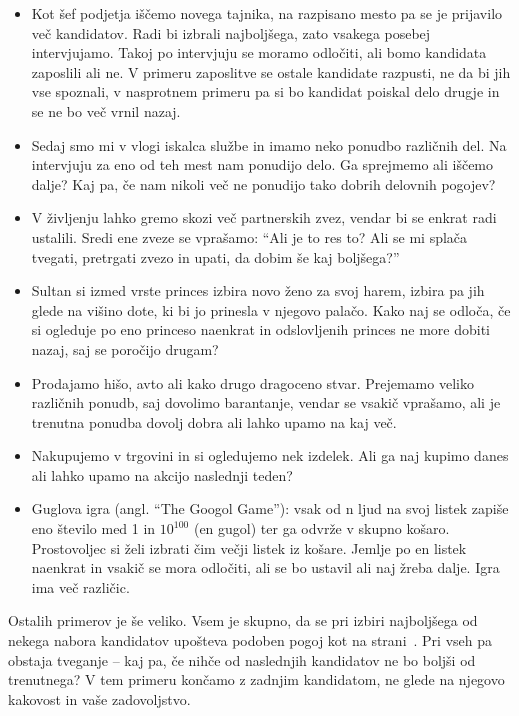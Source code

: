 \documentclass[a4paper, 12pt, titlepage]{article}
\begin{document}
\begin{itemize}
    \item Kot šef podjetja iščemo novega tajnika, na razpisano mesto pa se je prijavilo več kandidatov. Radi bi izbrali najboljšega, zato vsakega posebej intervjujamo. Takoj po intervjuju se moramo odločiti, ali bomo kandidata zaposlili ali ne. V primeru zaposlitve se ostale kandidate razpusti, ne da bi jih vse spoznali, v nasprotnem primeru pa si bo kandidat poiskal delo drugje in se ne bo več vrnil nazaj.
    \item Sedaj smo mi v vlogi iskalca službe in imamo neko ponudbo različnih del. Na intervjuju za eno od teh mest nam ponudijo delo. Ga sprejmemo ali iščemo dalje? Kaj pa, če nam nikoli več ne ponudijo tako dobrih delovnih pogojev?
    \item V življenju lahko gremo skozi več partnerskih zvez, vendar bi se enkrat radi ustalili. Sredi ene zveze se vprašamo: ``Ali je to res to? Ali se mi splača tvegati, pretrgati zvezo in upati, da dobim še kaj boljšega?''
    \item Sultan si izmed vrste princes izbira novo ženo za svoj harem, izbira pa jih glede na višino dote, ki bi jo prinesla v njegovo palačo. Kako naj se odloča, če si ogleduje po eno princeso naenkrat in odslovljenih princes ne more dobiti nazaj, saj se poročijo drugam?
    \item Prodajamo hišo, avto ali kako drugo dragoceno stvar. Prejemamo veliko različnih ponudb, saj dovolimo barantanje, vendar se vsakič vprašamo, ali je trenutna ponudba dovolj dobra ali lahko upamo na kaj več.
    \item Nakupujemo v trgovini in si ogledujemo nek izdelek. Ali ga naj kupimo danes ali lahko upamo na akcijo naslednji teden?
    \item Guglova igra (angl. ``The Googol Game''): vsak od n ljud na svoj listek zapiše eno število med 1 in $10^{100}$ (en gugol) ter ga odvrže v skupno košaro. Prostovoljec si želi izbrati čim večji listek iz košare. Jemlje po en listek naenkrat in vsakič se mora odločiti, ali se bo ustavil ali naj žreba dalje. Igra ima več različic.
\end{itemize}

Ostalih primerov je še veliko. Vsem je skupno, da se pri izbiri najboljšega od nekega nabora kandidatov upošteva podoben pogoj kot na strani~\pageref{pogoj_za_nakup}. Pri vseh pa obstaja tveganje -- kaj pa, če nihče od naslednjih kandidatov ne bo boljši od trenutnega? V tem primeru končamo z zadnjim kandidatom, ne glede na njegovo kakovost in vaše zadovoljstvo.
\end{document}
